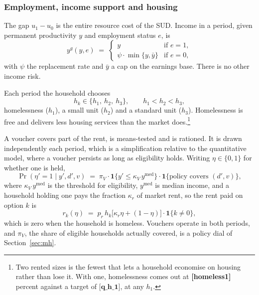 \documentclass[10pt]{article}
\begin{document}
\subsubsection{Employment, income support and housing}\label{sec:support}

The gap $u_1-u_0$ is the entire resource cost of the SUD. Income in a
period, given permanent productivity $y$ and employment status $e$, is
\begin{equation}\label{eq:inc}
y^{g}(y,e) \;=\;
\begin{cases}
y & \text{if } e = 1,\\[0.2em]
\psi\cdot\min\{y,\bar y\} & \text{if } e = 0,
\end{cases}
\end{equation}
with $\psi$ the replacement rate and $\bar y$ a cap on the earnings base. There
is no other income risk.

Each period the household chooses
\begin{equation}\label{eq:opts}
h_k \in \{h_1,\ h_2,\ h_3\}, \qquad h_1 < h_2 < h_3 ,
\end{equation}
homelessness ($h_1$), a small unit ($h_2$) and a standard unit
($h_3$). Homelessness is free and delivers less housing services than
the market does.\footnote{Two rented sizes is the fewest that lets a
household economise on housing rather than lose it. With one, homelessness comes
out at \textbf{[homeless1]} percent against a target of $\textbf{[q_h_1]}$, at any $h_1$.}

A voucher covers part of the rent, is means-tested and is rationed. It is drawn
independently each period, which is a simplification relative to the
quantitative model, where a voucher persists as long as eligibility holds.
Writing $\eta\in\{0,1\}$ for whether one is held,
\begin{equation}\label{eq:vouch}
\Pr(\eta'=1 \mid y', d', v) \;=\; \pi_V \cdot \mathbf{1}\{y' \le \kappa_V\,y^{\text{med}}\}
\cdot \mathbf{1}\{\text{policy covers } (d',v)\},
\end{equation}
where $\kappa_V\,y^{\text{med}}$ is the threshold for eligibility, $y^{\text{med}}$ is median income,
and a household holding one pays the fraction $\kappa_r$ of market rent, so the
rent paid on option $k$ is
\begin{equation}\label{eq:rent}
r_k(\eta) \;=\; p_r\,h_k\big[\kappa_r \eta + (1-\eta)\big]\cdot
\mathbf{1}\{k \ne 0\},
\end{equation}
which is zero when the household is homeless. Vouchers operate in both periods,
and $\pi_V$, the share of eligible households actually covered, is a policy
dial of Section~\ref{sec:mh}.
\end{document}
